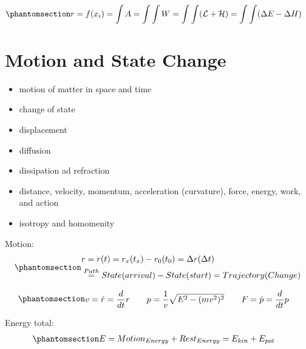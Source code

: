 \documentclass[
  letterpaper,
  DIV=11,
  numbers=noendperiod]{scrartcl}
\providecommand{\tightlist}{%
  \setlength{\itemsep}{0pt}\setlength{\parskip}{0pt}}
\begin{document}
\begin{equation}\phantomsection\label{eq-intro}{\begin{split} &
r = f(x_i) = \int A = \int \int W = \int \int (\mathcal{L} + \mathcal{H}) = \int \int (\Delta E - \Delta H)
\end{split}}\end{equation}

\hfill\break
\hfill\break

\section{Motion and State Change}\label{sec-motion}

\begin{itemize}
\tightlist
\item
  motion of matter in space and time
\item
  change of state
\item
  displacement
\item
  diffusion
\item
  dissipation ad refraction
\item
  distance, velocity, momentum, acceleration (curvature), force, energy,
  work, and action
\item
  isotropy and homomenity
\end{itemize}

Motion:
\begin{equation}\phantomsection\label{eq-trajectory}{\begin{split} &
r = r(t) = r_x(t_{x}) - r_0(t_{0} ) = \Delta r(\Delta t)
\\& \stackrel{Path}{=}
State(arrival) - State(start) = Trajectory(Change)
\end{split}}\end{equation}

\begin{equation}\phantomsection\label{eq-motion}{\begin{split} &
v = \dot r = \frac{d}{dt}r
\qquad
p = \frac{1}{v} \sqrt{E^2 - (mv^2)^2}
\qquad
F = \dot p = \frac{d}{dt}p
\end{split}}\end{equation}

Energy total:
\begin{equation}\phantomsection\label{eq-energytotal}{\begin{split} &
E = Motion_{Energy} + Rest_{Energy} = E_{kin} + E_{pot}
\end{split}}\end{equation}
\end{document}
